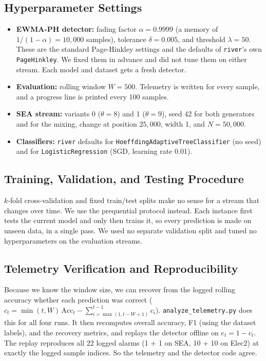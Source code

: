 \documentclass[conference]{IEEEtran}
\begin{document}
\subsection{Hyperparameter Settings}
\begin{itemize}
    \item \textbf{EWMA-PH detector:} fading factor $\alpha = 0.9999$ (a memory of $1 / (1 - \alpha) = 10{,}000$ samples), tolerance $\delta = 0.005$, and threshold $\lambda = 50$. These are the standard Page-Hinkley settings and the defaults of \texttt{river}'s own \texttt{PageHinkley}. We fixed them in advance and did not tune them on either stream. Each model and dataset gets a fresh detector.
    \item \textbf{Evaluation:} rolling window $W = 500$. Telemetry is written for every sample, and a progress line is printed every 100 samples.
    \item \textbf{SEA stream:} variants 0 ($\theta = 8$) and 1 ($\theta = 9$), seed 42 for both generators and for the mixing, change at position $25{,}000$, width 1, and $N = 50{,}000$.
    \item \textbf{Classifiers:} \texttt{river} defaults for \texttt{HoeffdingAdaptiveTreeClassifier} (no seed) and for \texttt{LogisticRegression} (SGD, learning rate 0.01).
\end{itemize}

\subsection{Training, Validation, and Testing Procedure}
$k$-fold cross-validation and fixed train/test splits make no sense for a stream that changes over time.
We use the prequential protocol instead.
Each instance first tests the current model and only then trains it, so every prediction is made on unseen data, in a single pass.
We used no separate validation split and tuned no hyperparameters on the evaluation streams.

\subsection{Telemetry Verification and Reproducibility}
\label{sec:verification}
Because we know the window size, we can recover from the logged rolling accuracy whether each prediction was correct ($c_t = \min(t, W)\,\text{Acc}_t - \sum_{i=\max(1, t-W+1)}^{t-1} c_i$).
\texttt{analyze\_telemetry.py} does this for all four runs.
It then recomputes overall accuracy, F1 (using the dataset labels), and the recovery metrics, and replays the detector offline on $e_t = 1 - c_t$.
The replay reproduces all 22 logged alarms (1 + 1 on SEA, 10 + 10 on Elec2) at exactly the logged sample indices.
So the telemetry and the detector code agree.
\end{document}
